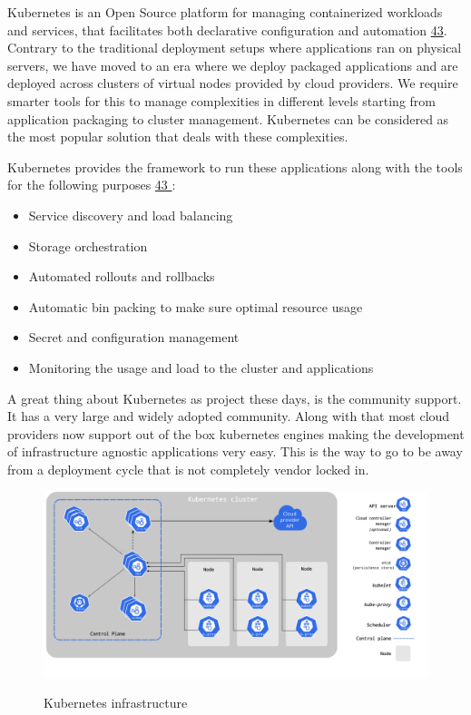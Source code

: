 \documentclass[12pt,titlepage]{article}
\begin{document}
Kubernetes is an Open Source platform for managing containerized workloads and
services, that facilitates both declarative configuration and automation \hyperref[ref:43]{43}.  
Contrary to the traditional deployment setups where applications ran on physical
servers, we have moved to an era where we deploy packaged applications and are
deployed across clusters of virtual nodes provided by cloud providers. We
require smarter tools for this to manage complexities in different levels
starting from application packaging to cluster management. Kubernetes can be
considered as the most popular solution that deals with these complexities.

Kubernetes provides the framework to run these applications along with the tools
for the following purposes \hyperref[ref:43]{43 }:
\begin{itemize}
\item Service discovery and load balancing
\item Storage orchestration
\item Automated rollouts and rollbacks
\item Automatic bin packing to make sure optimal resource usage
\item Secret and configuration management
\item Monitoring the usage and load to the cluster and applications
\end{itemize}

A great thing about Kubernetes as project these days, is the community support.
It has a very large and widely adopted community. Along with that most cloud
providers now support out of the box kubernetes engines making the development
of infrastructure agnostic applications very easy. This is the way to go to be
away from a deployment cycle that is not completely vendor locked in.

\begin{figure}[!h]
    \caption{Kubernetes infrastructure}
    \centering
    \includegraphics[width=180mm]{./thesis_images/k8s.png}
    \label{fig:k8s}
\end{figure}
\end{document}
